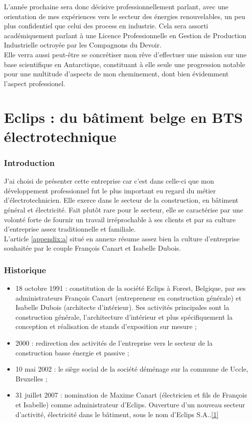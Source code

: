 \documentclass[a4paper, 12pt]{article}
\begin{document}
L'année prochaine sera donc décisive professionnellement parlant, avec une orientation de mes expériences vers le secteur des énergies renouvelables, un peu plus confidentiel que celui des process en industrie. Cela sera assorti académiquement parlant à une Licence Professionnelle en Gestion de Production Industrielle octroyée par les Compagnons du Devoir.\\
Elle verra aussi peut-être se concrétiser mon rêve d'effectuer une mission sur une base scientifique en Antarctique, constituant à elle seule une progression notable pour une multitude d'aspects de mon cheminement, dont bien évidemment l'aspect professionel.
\newpage 

\part{Eclips : du bâtiment belge en BTS électrotechnique}
 
 \section{Introduction}

J'ai choisi de présenter cette entreprise car c'est dans celle-ci que mon développement professionnel fut le plus important eu regard du métier d'électrotechnicien. Elle exerce dans le secteur de la construction, en bâtiment général et électricité. Fait plutôt rare pour le secteur, elle se caractérise par une volonté forte de fournir un travail irréprochable à ses clients et par sa culture d'entreprise assez traditionnelle et familiale.\\
L'article \ref{appendix:a} situé en annexe résume assez bien la culture d'entreprise souhaitée par le couple François Canart et Isabelle Dubois. 

\section{Historique}

\begin{itemize}
\item 18 octobre 1991 : constitution de la société Eclips à Forest, Belgique, par ses administrateurs François Canart (entrepreneur en construction générale) et Isabelle Dubois (architecte d'intérieur). Ses activités principales sont la construction générale, l'architecture d'intérieur et plus spécifiquement la conception et réalisation de stands d'exposition sur mesure ;
\item 2000 : redirection des activités de l'entreprise vers le secteur de la construction basse énergie et passive ;
\item 10 mai 2002 : le siège social de la société déménage sur la commune de Uccle, Bruxelles ;
\item 31 juillet 2007 : nomination de Maxime Canart (électricien et fils de François et Isabelle) comme administrateur d'Eclips. Ouverture d'un nouveau secteur d'activité, électricité dans le bâtiment, sous le nom d'Eclips S.A..\href{http://www.ejustice.just.fgov.be/cgi_tsv/tsv_rech.pl?language=fr&btw=0445246034&liste=Liste}{[1]}
\end{itemize}
\end{document}
